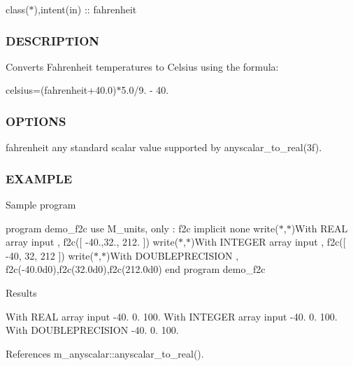 class($\ast$),intent(in) \+:\+: fahrenheit \subsubsection*{D\+E\+S\+C\+R\+I\+P\+T\+I\+ON}

Converts Fahrenheit temperatures to Celsius using the formula\+:

celsius=(fahrenheit+40.0)$\ast$5.0/9. -\/ 40. \subsubsection*{O\+P\+T\+I\+O\+NS}

fahrenheit any standard scalar value supported by anyscalar\+\_\+to\+\_\+real(3f). \subsubsection*{E\+X\+A\+M\+P\+LE}

Sample program

program demo\+\_\+f2c use M\+\_\+units, only \+: f2c implicit none write($\ast$,$\ast$)\textquotesingle{}With R\+E\+AL array input \textquotesingle{}, f2c(\mbox{[} -\/40.,32., 212. \mbox{]}) write($\ast$,$\ast$)\textquotesingle{}With I\+N\+T\+E\+G\+ER array input \textquotesingle{}, f2c(\mbox{[} -\/40, 32, 212 \mbox{]}) write($\ast$,$\ast$)\textquotesingle{}With D\+O\+U\+B\+L\+E\+P\+R\+E\+C\+I\+S\+I\+ON \textquotesingle{}, f2c(-\/40.\+0d0),f2c(32.\+0d0),f2c(212.\+0d0) end program demo\+\_\+f2c

Results

With R\+E\+AL array input -\/40. 0. 100. With I\+N\+T\+E\+G\+ER array input -\/40. 0. 100. With D\+O\+U\+B\+L\+E\+P\+R\+E\+C\+I\+S\+I\+ON -\/40. 0. 100. 

References m\+\_\+anyscalar\+::anyscalar\+\_\+to\+\_\+real().

